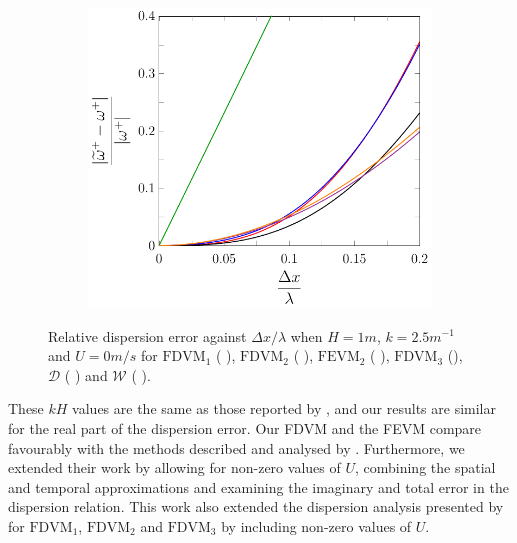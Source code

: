 \begin{figure}
\begin{subfigure}{0.5\textwidth}
	\end{subfigure}
	\par\bigskip
	\begin{subfigure}{0.5\textwidth}
		\includegraphics[width=\textwidth]{./chp4/figures/New/Dispu0Fill.pdf}
	\end{subfigure}
	\caption{Relative dispersion error against $\Delta x / \lambda$ when $H = 1m$, $k = 2.5m^{-1}$ and $U = 0m/s$ for $\text{FDVM}_1$ ({\color{green!60!black} \solidrule}), $\text{FDVM}_2$ ({\color{red} \solidrule}), $\text{FEVM}_2$ ({\color{blue} \solidrule}), $\text{FDVM}_3$ ({\solidrule}), $\mathcal{D}$ ({\color{violet!80!white} \solidrule}) and $\mathcal{W}$ ({\color{orange} \solidrule}).}
	\label{fig:Dispu0Fill}
\end{figure}

These $kH$ values are the same as those reported by \citet{Filippini-etal-2016-381}, and our results are similar for the real part of the dispersion error. Our FDVM and the FEVM compare favourably with the methods described and analysed by \citet{Filippini-etal-2016-381}. Furthermore, we extended their work by allowing for non-zero values of $U$, combining the spatial and temporal approximations and examining the imaginary and total error in the dispersion relation. This work also extended the dispersion analysis presented by \citet{Zoppou-etal-2017} for $\text{FDVM}_1$, $\text{FDVM}_2$ and $\text{FDVM}_3$ by including non-zero values of $U$.

